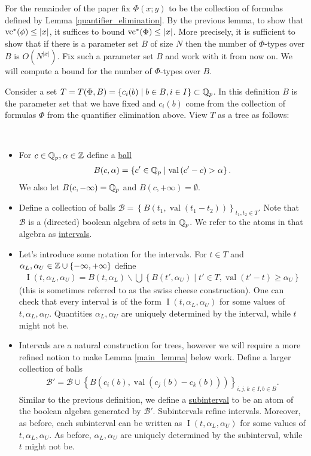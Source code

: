 \documentclass{amsart}
\newcommand{\BB}{\mathscr B}
\newcommand{\curly}[1]{\left\{#1\right\}}
\newcommand{\paren}[1]{\left(#1\right)}
\DeclareMathOperator{\vval}{val}
\DeclareMathOperator{\inti}{I}
\newcommand{\defn}{\underline}
\newcommand{\interval}{\inti(t, \alpha_L, \alpha_U)}
\begin{document}
For the remainder of the paper fix $\Phi(x; y)$ to be the collection of formulas defined by Lemma \ref{quantifier_elimination}.
By the previous lemma, to show that $\operatorname{vc}^*(\phi) \leq |x|$, it suffices to bound $\operatorname{vc}^*(\Phi) \leq |x|$.
More precisely, it is sufficient to show that if there is a parameter set $B$ of size $N$
then the number of $\Phi$-types over $B$ is $O(N^{|x|})$.
Fix such a parameter set $B$ and work with it from now on.
We will compute a bound for the number of $\Phi$-types over $B$.

Consider a set $T = T(\Phi, B) = \curly{c_i(b) \mid b \in B, i \in I} \subset \Q_p$.
In this definition $B$ is the parameter set that we have fixed 
and $c_i(b)$ come from the collection of formulas $\Phi$ from the quantifier elimination above.
View $T$ as a tree as follows:
\begin{Definition} \ 
  \begin{itemize}
  \item For $c \in \mathbb{Q}_p, \alpha \in \mathbb{Z}$  define a \defn{ball} 
    \begin{align*}
      B(c, \alpha) = \curly{c' \in \Q_p \mid \vval \paren{c' - c} > \alpha}.  
    \end{align*}
    We also let $B(c, -\infty) = \mathbb{Q}_p$ and $B(c, +\infty) = \emptyset$.
  \item Define a collection of balls $\BB = \curly{B(t_1, \vval(t_1 - t_2))}_{t_1, t_2 \in T}$.
    Note that $\BB$ is a (directed) boolean algebra of sets in $\mathbb{Q}_p$.
    We refer to the atoms in that algebra as \defn{intervals}.
  \item Let's introduce some notation for the intervals.
    For $t \in T$ and $\alpha_L, \alpha_U \in \Z \cup \curly{-\infty, +\infty}$ define
    \begin{align*}
      \interval = B(t, \alpha_L) \backslash \bigcup \curly{B(t', \alpha_U) \mid t' \in T, \vval(t' - t) \geq \alpha_U}
    \end{align*}
    (this is sometimes referred to as the swiss cheese construction).
    One can check that every interval is of the form $\interval$ for some values of $t, \alpha_L, \alpha_U$.
    Quantities $\alpha_L, \alpha_U$ are uniquely determined by the interval,
    while $t$ might not be.
  \item Intervals are a natural construction for trees, however we will require a more refined notion to make Lemma \ref{main_lemma} below work.
    Define a larger collection of balls 
    \begin{align*}
      \BB' = \BB \cup \curly{B(c_i(b), \vval(c_j(b) - c_k(b)))}_{i,j,k \in I, b \in B}.  
    \end{align*}
    Similar to the previous definition, we define a \defn{subinterval} to be an atom of the boolean algebra generated by $\BB'$.
    Subintervals refine intervals.
    Moreover, as before, each subinterval can be written as $\interval$ for some values of $t, \alpha_L, \alpha_U$.
    As before, $\alpha_L, \alpha_U$ are uniquely determined by the subinterval,
    while $t$ might not be.
  \end{itemize}
\end{Definition}
\end{document}
